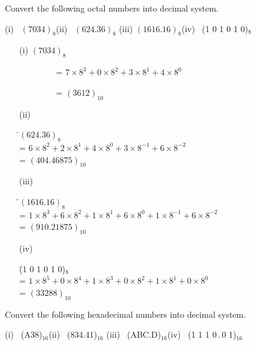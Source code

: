 \begin{problem}\label{prob5.2}
Convert the following octal numbers into decimal system.

\medskip
(i)~ $(7034)_{8}$\hfil (ii)~ $(624.36)_{8}$\hfil
(iii) $(1616.16)_{8}$\hfil (iv)~  (1 0 1 0 1 0)$_{8}$
\end{problem}

\begin{solution}
\begin{itemize}
\item[(i)] $(7034)_{8}$

\qquad~~~~~~~~ = $7\times 8^{3}+0\times 8^{2}+3\times 8^{1}+4\times 8^{0}$

\qquad~~~~~~~~ = $(3612)_{10}$

\item[(ii)] 
\begin{tabbing}
\=$(624.36)_{8}$\\[3pt]
\>= $6\times 8^{2}+2\times 8^{1}+4\times 8^{0}+3\times 8^{-1}+6\times 8^{-2}$\\[3pt]
\>= $(404.46875)_{10}$
\end{tabbing}

\item[(iii)]
\begin{tabbing}
\=$(1616.16)_{8}$\\[3pt]
\>= $1\times 8^{3}+6\times 8^{2}+1\times 8^{1}+6\times 8^{0}+1\times 8^{-1}+6\times 8^{-2}$\\[3pt]
\>= $(910.21875)_{10}$
\end{tabbing}

\item[(iv)]
\begin{tabbing}
\=(1 0 1 0 1 0)$_{8}$\\[3pt]
\>= $1\times 8^{5}+0\times 8^{4}+1\times 8^{3}+0\times 8^{2}+1\times 8^{1}+0\times 8^{0}$\\[3pt]
\>= $(33288)_{10}$
\end{tabbing}
\end{itemize}
\end{solution}

\begin{problem}\label{prob5.3}
Convert the following hexadecimal numbers into decimal system.

\medskip
(i)~ (A38)$_{16}$\hfil (ii)~  (834.41)$_{16}$\hfil
(iii)~ (ABC.D)$_{16}$\hfil (iv)~ (1 1 1 0\,.\,0 1)$_{16}$
\end{problem}

